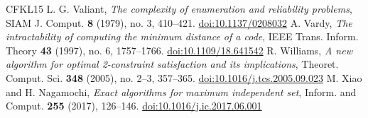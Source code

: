 \documentclass[11pt,reqno]{amsart}
\numberwithin{equation}{section}
\theoremstyle{plain}
\theoremstyle{definition}
\theoremstyle{remark}
\begin{document}
\begin{thebibliography}{CFKL15}
 L. G. Valiant, \emph{The complexity of enumeration and reliability problems}, SIAM J. Comput. \textbf{8} (1979), no. 3, 410--421. \href{https://doi.org/10.1137/0208032}{doi:10.1137/0208032}
 A. Vardy, \emph{The intractability of computing the minimum distance of a code}, IEEE Trans. Inform. Theory \textbf{43} (1997), no. 6, 1757--1766. \href{https://doi.org/10.1109/18.641542}{doi:10.1109/18.641542}
 R. Williams, \emph{A new algorithm for optimal 2-constraint satisfaction and its implications}, Theoret. Comput. Sci. \textbf{348} (2005), no. 2--3, 357--365. \href{https://doi.org/10.1016/j.tcs.2005.09.023}{doi:10.1016/j.tcs.2005.09.023}
 M. Xiao and H. Nagamochi, \emph{Exact algorithms for maximum independent set}, Inform. and Comput. \textbf{255} (2017), 126--146. \href{https://doi.org/10.1016/j.ic.2017.06.001}{doi:10.1016/j.ic.2017.06.001}
\end{thebibliography}
\endgroup
\end{document}

